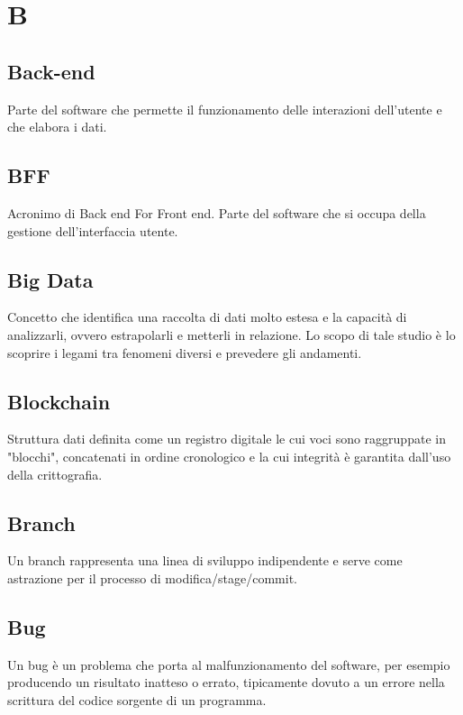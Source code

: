 \section*{B}
\markright{}

\subsection*{Back-end}
Parte del software che permette il funzionamento delle interazioni dell'utente e che elabora i dati.

\subsection*{BFF}
Acronimo di Back end For Front end. Parte del software che si occupa della gestione dell'interfaccia utente.

\subsection*{Big Data}
Concetto che identifica una raccolta di dati molto estesa e la capacità di analizzarli, ovvero estrapolarli e metterli in relazione. Lo scopo di tale studio è lo scoprire i legami tra fenomeni diversi e prevedere gli andamenti.

\subsection*{Blockchain}
Struttura dati definita come un registro digitale le cui voci sono raggruppate in "blocchi", concatenati in ordine cronologico e la cui integrità è garantita dall'uso della crittografia.

\subsection*{Branch}
Un branch rappresenta una linea di sviluppo indipendente e serve come astrazione per il processo di modifica/stage/commit.

\subsection*{Bug}
Un bug è un problema che porta al malfunzionamento del software, per esempio producendo un risultato inatteso o errato, tipicamente dovuto a un errore nella scrittura del codice sorgente di un programma. 




